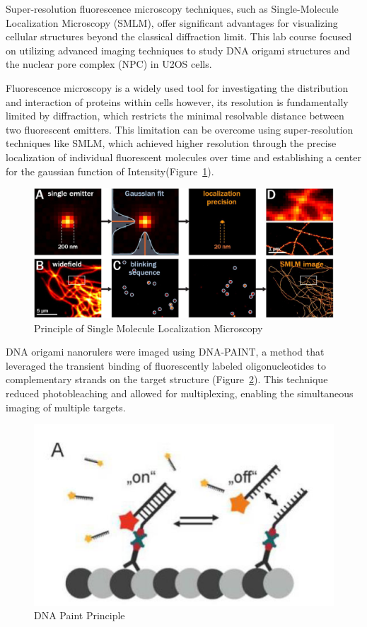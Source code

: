 \documentclass[a4paper,english,12pt,bibliography=totoc]{scrreprt}
\begin{document}
Super-resolution fluorescence microscopy techniques, such as Single-Molecule Localization Microscopy (SMLM), offer significant advantages for visualizing cellular structures beyond the classical diffraction limit. This lab course focused on utilizing advanced imaging techniques to study DNA origami structures and the nuclear pore complex (NPC) in U2OS cells.

Fluorescence microscopy is a widely used tool for investigating the distribution and interaction of proteins within cells however, its resolution is fundamentally limited by diffraction, which restricts the minimal resolvable distance between two fluorescent emitters. This limitation can be overcome using super-resolution techniques like SMLM, which achieved higher resolution through the precise localization of individual fluorescent molecules over time and establishing a center for the gaussian function of Intensity(Figure~\ref{fig:smlsm}).


\begin{figure}[H]
            \centering
            \includegraphics[width=1\linewidth]{Principle of Single Molecule Localization Microscopy (SMLM).png }
            \caption{Principle of Single Molecule Localization Microscopy \cite{Jimenez2019}}
            \label{fig:smlsm}
\end{figure}
 

DNA origami nanorulers were imaged using DNA-PAINT, a method that leveraged the transient binding of fluorescently labeled oligonucleotides to complementary strands on the target structure (Figure~\ref{fig:dnapaint}). This technique reduced photobleaching and allowed for multiplexing, enabling the simultaneous imaging of multiple targets.
\begin{figure}[H]
        \centering
        \includegraphics[width=0.9\linewidth]{dnapaint.png}
        \caption{DNA Paint Principle \cite{Sauer2017-hu}}
        \label{fig:dnapaint}
    \end{figure}
\end{document}
